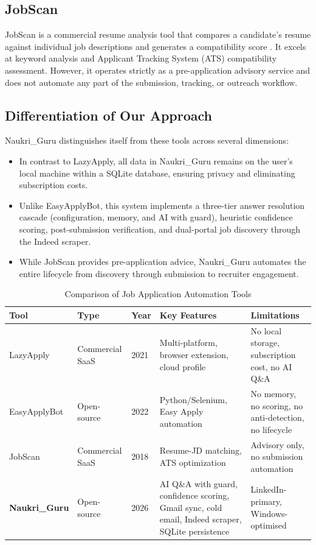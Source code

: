 \documentclass[12pt, a4paper, oneside]{report}
\begin{document}
\subsection{JobScan}
JobScan is a commercial resume analysis tool that compares a candidate's resume against individual job descriptions and generates a compatibility score \cite{ref4}. It excels at keyword analysis and Applicant Tracking System (ATS) compatibility assessment. However, it operates strictly as a pre-application advisory service and does not automate any part of the submission, tracking, or outreach workflow.

\subsection{Differentiation of Our Approach}
Naukri\_Guru distinguishes itself from these tools across several dimensions:

\begin{itemize}
    \item In contrast to LazyApply, all data in Naukri\_Guru remains on the user's local machine within a SQLite database, ensuring privacy and eliminating subscription costs.
    \item Unlike EasyApplyBot, this system implements a three-tier answer resolution cascade (configuration, memory, and AI with guard), heuristic confidence scoring, post-submission verification, and dual-portal job discovery through the Indeed scraper.
    \item While JobScan provides pre-application advice, Naukri\_Guru automates the entire lifecycle from discovery through submission to recruiter engagement.
\end{itemize}

\begin{table}[H]
\centering
\caption{Comparison of Job Application Automation Tools}
\label{tab:cat-a-comparison}
\small
\begin{tabularx}{\textwidth}{|l|l|l|X|X|}
\hline
\textbf{Tool} & \textbf{Type} & \textbf{Year} & \textbf{Key Features} & \textbf{Limitations} \\
\hline
LazyApply \cite{ref2} & Commercial SaaS & 2021 & Multi-platform, browser extension, cloud profile & No local storage, subscription cost, no AI Q\&A \\
\hline
EasyApplyBot \cite{ref3} & Open-source & 2022 & Python/Selenium, Easy Apply automation & No memory, no scoring, no anti-detection, no lifecycle \\
\hline
JobScan \cite{ref4} & Commercial SaaS & 2018 & Resume-JD matching, ATS optimization & Advisory only, no submission automation \\
\hline
\textbf{Naukri\_Guru} & Open-source & 2026 & AI Q\&A with guard, confidence scoring, Gmail sync, cold email, Indeed scraper, SQLite persistence & LinkedIn-primary, Windows-optimised \\
\hline
\end{tabularx}
\end{table}
\end{document}
